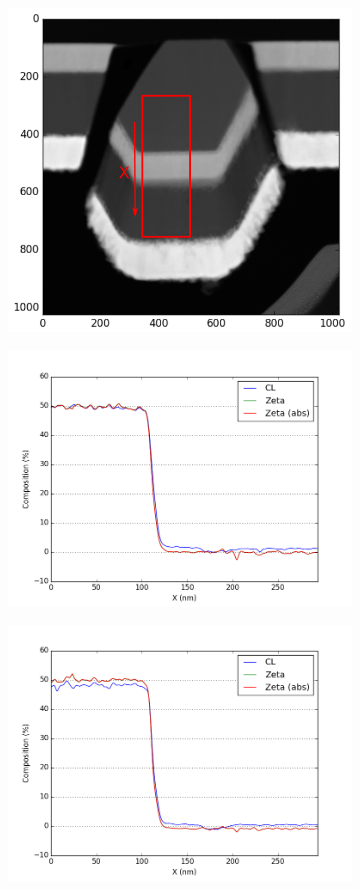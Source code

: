 \begin{figure}
	\begin{subfigure}{.5\textwidth}
		\centering
		\newlength\imageheight
		\includegraphics[width=.68\linewidth]{fig/q/1_overview3}
		\caption{}
		\label{fig:zeta_area1_overview}
	\end{subfigure}
	\begin{subfigure}{.45\textwidth}
		\centering
		\includegraphics[width=\linewidth]{fig/q/1_ga_nm}
		\caption{}
		\label{fig:zeta_area1_ga}
	\end{subfigure}%
\hfill
	\begin{subfigure}{.45\textwidth}
		\centering
		\includegraphics[width=\linewidth]{fig/q/1_as_nm}

\end{subfigure}
\end{figure}
